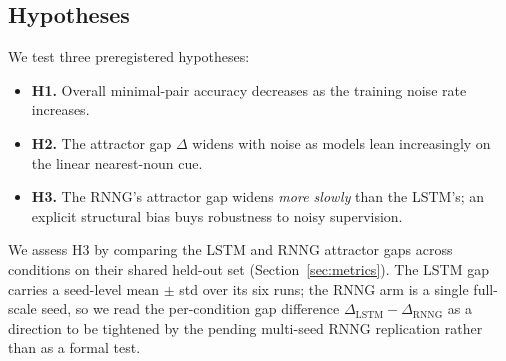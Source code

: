 \subsection{Hypotheses}
\label{sec:hypotheses}
We test three preregistered hypotheses:
\begin{itemize}
  \item \textbf{H1.} Overall minimal-pair accuracy decreases as the training
    noise rate increases.
  \item \textbf{H2.} The attractor gap $\Delta$ widens with noise as models lean
    increasingly on the linear nearest-noun cue.
  \item \textbf{H3.} The RNNG's attractor gap widens \emph{more slowly} than the
    LSTM's; an explicit structural bias buys robustness to noisy supervision.
\end{itemize}
We assess H3 by comparing the LSTM and RNNG attractor gaps across conditions on
their shared held-out set (Section~\ref{sec:metrics}). The LSTM gap carries a
seed-level mean $\pm$ std over its six runs; the RNNG arm is a single full-scale
seed, so we read the per-condition gap difference
$\Delta_{\text{LSTM}} - \Delta_{\text{RNNG}}$ as a direction to be tightened by
the pending multi-seed RNNG replication rather than as a formal test.
